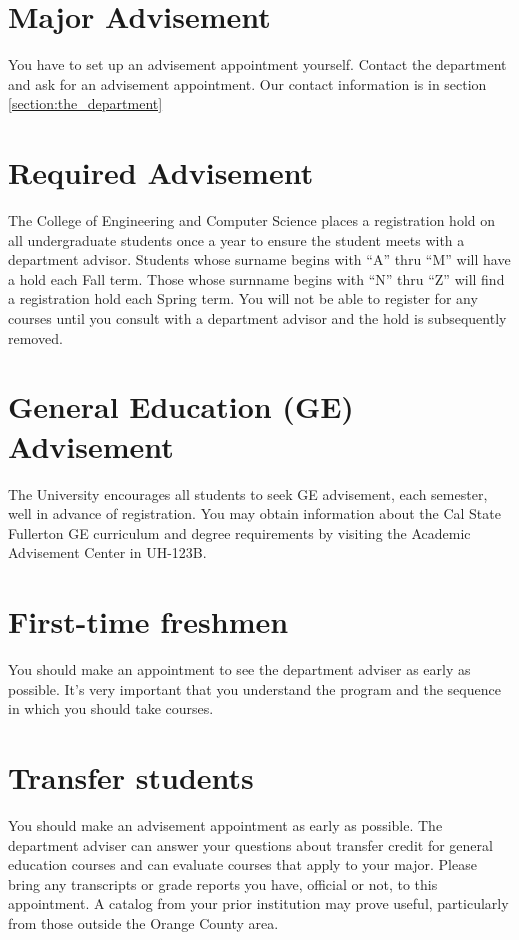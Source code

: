 \documentclass{book}
\begin{document}
\section{Major Advisement}
You have to set up an advisement appointment yourself. Contact the department and ask for an advisement appointment. Our contact information is in section \ref{section:the_department}

\section{Required Advisement}
The College of Engineering and Computer Science places a registration hold on all undergraduate students once a year to ensure the student meets with a department advisor. Students whose surname begins with ``A'' thru ``M'' will have a hold each Fall term. Those whose surnname begins with ``N'' thru ``Z'' will find a registration hold each Spring term.  You will not be able to register for any courses until you consult with a department advisor and the hold is subsequently removed.

\section{General Education (GE) Advisement}
 
The University encourages all students to seek GE advisement, each semester, well in advance of registration.  You may obtain information about the Cal State Fullerton GE curriculum and degree requirements by visiting the Academic Advisement Center in UH-123B.

\section{First-time freshmen}
You should make an appointment to see the department adviser as early as possible. It’s very important that you understand the program and the sequence in which you should take courses.

\section{Transfer students}
You should make an advisement appointment as early as possible. The department adviser can answer your questions about transfer credit for general education courses and can evaluate courses that apply to your major. Please bring any transcripts or grade reports you have, official or not, to this appointment. A catalog from your prior institution may prove useful, particularly from those outside the Orange County area.
\end{document}
